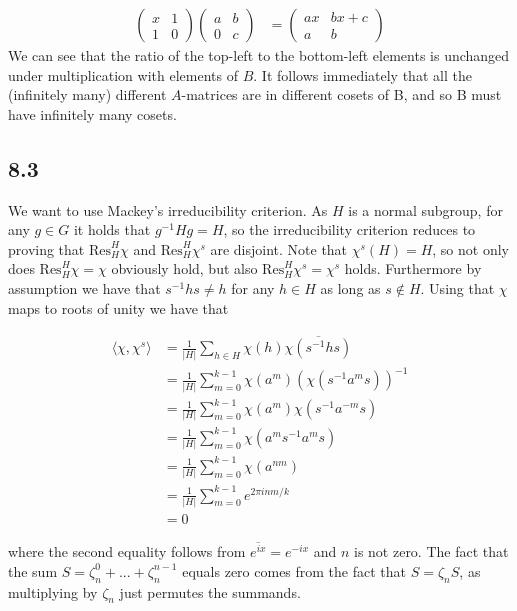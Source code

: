 \documentclass[12pt]{article}
\begin{document}
\begin{align*}
    \begin{pmatrix} x & 1 \\ 1 & 0 \end{pmatrix} \begin{pmatrix} a & b \\ 0 & c \end{pmatrix}  &= \begin{pmatrix} ax & bx+c \\ a & b \end{pmatrix}
\end{align*}
We can see that the ratio of the top-left to the bottom-left elements is unchanged under multiplication with elements of $B$. It follows immediately that all the (infinitely many) different $A$-matrices are in different cosets of B, and so B must have infinitely many cosets.

\subsection*{8.3}

We want to use Mackey's irreducibility criterion. As $H$ is a normal subgroup, for any $g \in G$ it holds that $g^{-1}Hg = H$, so the irreducibility criterion reduces to proving that $\mathrm{Res}^H_H \chi$ and $\mathrm{Res}^H_H \chi^s$ are disjoint. Note that $\chi^s(H) = H$, so not only does $\mathrm{Res}^H_H \chi = \chi$ obviously hold, but also $\mathrm{Res}^H_H \chi^s = \chi^s$ holds. Furthermore by assumption we have that $s^{-1} h s \neq h$ for any $h \in H$ as long as $s \notin H$. Using that $\chi$ maps to roots of unity we have that

\begin{align*}
    \langle \chi, \chi^s \rangle &= \frac{1}{|H|} \sum_{h \in H} \chi(h) \overline{\chi(s^{-1} h s)} \\
    &= \frac{1}{|H|} \sum_{m = 0}^{k-1} \chi(a^m) (\chi(s^{-1} a^m s))^{-1} \\
    &= \frac{1}{|H|} \sum_{m = 0}^{k-1} \chi(a^m) \chi(s^{-1} a^{-m} s) \\
    &= \frac{1}{|H|} \sum_{m = 0}^{k-1} \chi(a^m s^{-1} a^m s) \\
    &= \frac{1}{|H|} \sum_{m = 0}^{k-1} \chi(a^{nm}) \\
    &= \frac{1}{|H|} \sum_{m = 0}^{k-1} e^{2\pi i nm/k} \\
    &= 0
\end{align*}

\noindent
where the second equality follows from $\overline{e^{ix}} = e^{-ix}$ and $n$ is not zero. The fact that the sum $S = \zeta_n^0 + ... + \zeta_n^{n-1}$ equals zero comes from the fact that $S = \zeta_n S$, as multiplying by $\zeta_n$ just permutes the summands.
\end{document}

